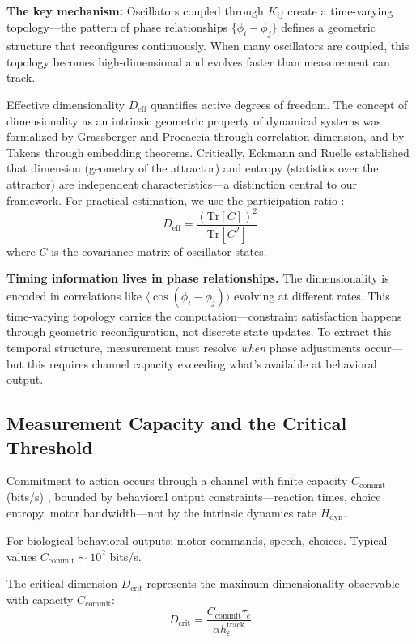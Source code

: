 \documentclass[12pt]{article}
\begin{document}
\textbf{The key mechanism:} Oscillators coupled through $K_{ij}$ create a time-varying topology—the pattern of phase relationships $\{\phi_i - \phi_j\}$ defines a geometric structure that reconfigures continuously. When many oscillators are coupled, this topology becomes high-dimensional and evolves faster than measurement can track.

Effective dimensionality $D_{\text{eff}}$ quantifies active degrees of freedom. The concept of dimensionality as an intrinsic geometric property of dynamical systems was formalized by Grassberger and Procaccia \cite{grassberger1983} through correlation dimension, and by Takens \cite{takens1981} through embedding theorems. Critically, Eckmann and Ruelle \cite{eckmann1985} established that dimension (geometry of the attractor) and entropy (statistics over the attractor) are independent characteristics---a distinction central to our framework. For practical estimation, we use the participation ratio \cite{gao2017}:
\begin{equation}
D_{\text{eff}} = \frac{(\text{Tr}[C])^2}{\text{Tr}[C^2]}
\end{equation}
where $C$ is the covariance matrix of oscillator states.

\textbf{Timing information lives in phase relationships.} The dimensionality is encoded in correlations like $\langle \cos(\phi_i - \phi_j) \rangle$ evolving at different rates. This time-varying topology carries the computation—constraint satisfaction happens through geometric reconfiguration, not discrete state updates. To extract this temporal structure, measurement must resolve \textit{when} phase adjustments occur---but this requires channel capacity exceeding what's available at behavioral output.

\subsection{Measurement Capacity and the Critical Threshold}

Commitment to action occurs through a channel with finite capacity $C_{\text{commit}}$ (bits/s) \cite{shannon1948}, bounded by behavioral output constraints---reaction times, choice entropy, motor bandwidth---not by the intrinsic dynamics rate $H_{\text{dyn}}$.

For biological behavioral outputs: motor commands, speech, choices. Typical values $C_{\text{commit}} \sim 10^2$ bits/s.

The critical dimension $D_{\text{crit}}$ represents the maximum dimensionality observable with capacity $C_{\text{commit}}$:
\begin{equation}
D_{\text{crit}} = \frac{C_{\text{commit}} \tau_e}{\alpha h_\varepsilon^{\text{track}}}
\end{equation}
\end{document}
